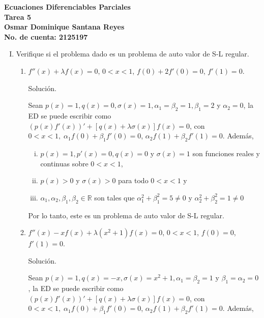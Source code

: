 \documentclass[fleqn]{article}
\newcommand{\real}{\mathbb{R}}
\begin{document}
	\bfseries
	Ecuaciones Diferenciables Parciales \\
	Tarea 5 \\
	Osmar Dominique Santana Reyes \\
	No. de cuenta: 2125197 \\

	\begin{enumerate}[I.]
		\item Verifique si el problema dado es un problema de auto valor de S-L regular.
		
		\begin{enumerate}
			\item $ f''(x) + \lambda f(x) = 0 $, $ 0 < x < 1 $, $ f(0) + 2 f'(0) = 0 $, $ f'(1) = 0 $.
			
			Solución.
			
			\normalfont

			Sean $ p(x) = 1, q(x) = 0, \sigma(x) = 1, \alpha_1 = \beta_2 = 1, \beta_1 = 2 $ y $ \alpha_2 = 0 $, la ED se puede escribir como $ \left( p(x) f'(x) \right)' + \left[ q(x) + \lambda \sigma(x) \right] f(x) = 0 $, con $ 0 < x < 1, \; \alpha_1 f(0) + \beta_1 f'(0) = 0 $, $ \alpha_2 f(1) + \beta_2 f'(1) = 0 $. Además,

			\begin{enumerate}[i)]
				\item $ p(x) = 1, p'(x) = 0, q(x) = 0 $ y $ \sigma(x) = 1 $ son funciones reales y continuas sobre $ 0 < x < 1 $,
				\item $ p(x) > 0 $ y $ \sigma(x) > 0 $ para todo $ 0 < x < 1 $ y
				\item $ \alpha_1, \alpha_2, \beta_1, \beta_2 \in \real $ son tales que $ \alpha_1^2 + \beta_1^2 = 5 \neq 0 $ y $ \alpha_2^2 + \beta_2^2 = 1 \neq 0 $
			\end{enumerate}

			Por lo tanto, este es un problema de auto valor de S-L regular.

			\bfseries


			\item $ f''(x) - x f(x) + \lambda (x^2 + 1) f(x) = 0 $, $ 0 < x < 1 $, $ f(0) = 0 $, $ f'(1) = 0 $.
			
			Solución.
			
			\normalfont

			Sean $ p(x) = 1, q(x) = -x, \sigma(x) = x^2 + 1, \alpha_1 = \beta_2 = 1 $ y $ \beta_1 = \alpha_2 = 0 $, la ED se puede escribir como $ \left( p(x) f'(x) \right)' + \left[ q(x) + \lambda \sigma(x) \right] f(x) = 0 $, con $ 0 < x < 1, \; \alpha_1 f(0) + \beta_1 f'(0) = 0 $, $ \alpha_2 f(1) + \beta_2 f'(1) = 0 $. Además,


\end{enumerate}
\end{enumerate}
\end{document}
